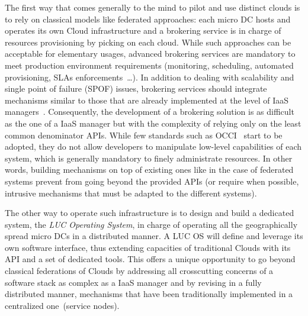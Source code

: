 The first way that comes generally to the mind to pilot and use
distinct clouds is to rely on classical models like federated
approaches: each micro DC hosts and operates
its own Cloud infrastructure and a brokering service is in
charge of resources provisioning by picking on each cloud. While such
approaches can be acceptable for elementary usages, advanced brokering
services are mandatory to meet production environment requirements
(monitoring, scheduling, automated provisioning, SLAs
enforcements~\ldots). In addition to dealing with scalability and
single point of failure (SPOF) issues, brokering services should
integrate mechanisms similar to those that are already implemented at
the level of IaaS managers~\cite{buyya:2010,houidi:2011}.
Consequently, the development of a brokering
solution is as difficult as the one of a IaaS manager but with the
complexity of relying only on the least common denominator APIs.
While few standards such as OCCI~\cite{loutas:2010} start to be
adopted, they do not allow developers to manipulate low-level
capabilities of each system, which is generally mandatory to finely
administrate resources.
In other words, building mechanisms on top of existing ones like in the case of federated systems prevent from going beyond the provided APIs (or require when possible, intrusive mechanisms that must be adapted to the different systems).

The other way to operate such infrastructure is to design and build a dedicated system,
\ie the \emph{LUC Operating System}, in charge of operating all the geographically spread
micro DCs in a distributed manner. %
A LUC OS will define and leverage its own software interface, thus
extending capacities of traditional Clouds with its API and a set of dedicated
tools. This
offers a unique opportunity to go beyond classical federations of
Clouds by addressing all
 crosscutting concerns of a software stack as complex as a IaaS manager and by revising in a fully distributed manner, mechanisms that have been traditionally
implemented in a centralized one~(service nodes).

